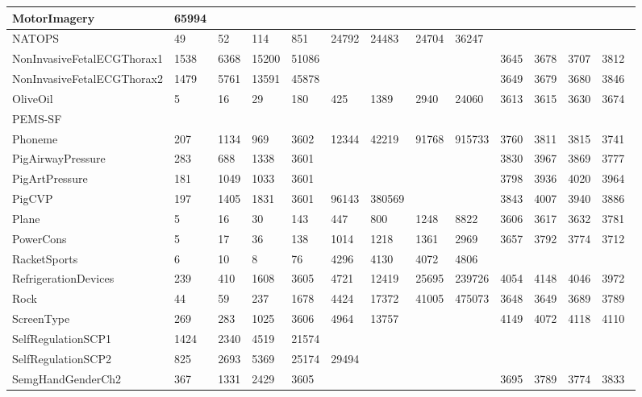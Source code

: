 \begin{landscape}
\begin{longtable}{|l|llll|llll|llll|}
      MotorImagery & 65994 &  &  &  &  &  &  &  &  &  &  &  \\ \hline
      NATOPS & 49 & 52 & 114 & 851 & 24792 & 24483 & 24704 & 36247 &  &  &  &  \\ \hline
      NonInvasiveFetalECGThorax1 & 1538 & 6368 & 15200 & 51086 &  &  &  &  & 3645 & 3678 & 3707 & 3812 \\ \hline
      NonInvasiveFetalECGThorax2 & 1479 & 5761 & 13591 & 45878 &  &  &  &  & 3649 & 3679 & 3680 & 3846 \\ \hline
      OliveOil & 5 & 16 & 29 & 180 & 425 & 1389 & 2940 & 24060 & 3613 & 3615 & 3630 & 3674 \\ \hline
      PEMS-SF &  &  &  &  &  &  &  &  &  &  &  &  \\ \hline
      Phoneme & 207 & 1134 & 969 & 3602 & 12344 & 42219 & 91768 & 915733 & 3760 & 3811 & 3815 & 3741 \\ \hline
      PigAirwayPressure & 283 & 688 & 1338 & 3601 &  &  &  &  & 3830 & 3967 & 3869 & 3777 \\ \hline
      PigArtPressure & 181 & 1049 & 1033 & 3601 &  &  &  &  & 3798 & 3936 & 4020 & 3964 \\ \hline
      PigCVP & 197 & 1405 & 1831 & 3601 & 96143 & 380569 &  &  & 3843 & 4007 & 3940 & 3886 \\ \hline
      Plane & 5 & 16 & 30 & 143 & 447 & 800 & 1248 & 8822 & 3606 & 3617 & 3632 & 3781 \\ \hline
      PowerCons & 5 & 17 & 36 & 138 & 1014 & 1218 & 1361 & 2969 & 3657 & 3792 & 3774 & 3712 \\ \hline
      RacketSports & 6 & 10 & 8 & 76 & 4296 & 4130 & 4072 & 4806 &  &  &  &  \\ \hline
      RefrigerationDevices & 239 & 410 & 1608 & 3605 & 4721 & 12419 & 25695 & 239726 & 4054 & 4148 & 4046 & 3972 \\ \hline
      Rock & 44 & 59 & 237 & 1678 & 4424 & 17372 & 41005 & 475073 & 3648 & 3649 & 3689 & 3789 \\ \hline
      ScreenType & 269 & 283 & 1025 & 3606 & 4964 & 13757 &  &  & 4149 & 4072 & 4118 & 4110 \\ \hline
      SelfRegulationSCP1 & 1424 & 2340 & 4519 & 21574 &  &  &  &  &  &  &  &  \\ \hline
      SelfRegulationSCP2 & 825 & 2693 & 5369 & 25174 & 29494 &  &  &  &  &  &  &  \\ \hline
      SemgHandGenderCh2 & 367 & 1331 & 2429 & 3605 &  &  &  &  & 3695 & 3789 & 3774 & 3833 \\ \hline

\end{longtable}
\end{landscape}
